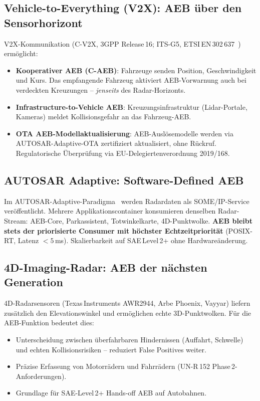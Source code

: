 ﻿\documentclass[a4paper,12pt]{article}
\theoremstyle{definition}
\begin{document}
\subsection{Vehicle-to-Everything (V2X): AEB \"uber den Sensorhorizont}

V2X-Kommunikation (C-V2X, 3GPP Release\,16; ITS-G5,
ETSI\,EN\,302\,637~\cite{etsi302637}) erm\"oglicht:

\begin{itemize}
  \item \textbf{Kooperativer AEB (C-AEB)}: Fahrzeuge senden Position,
        Geschwindigkeit und Kurs. Das empfangende Fahrzeug aktiviert
        AEB-Vorwarnung auch bei verdeckten Kreuzungen -- \emph{jenseits}
        des Radar-Horizonts.
  \item \textbf{Infrastructure-to-Vehicle AEB}: Kreuzungsinfrastruktur
        (Lidar-Portale, Kameras) meldet Kollisionsgefahr an das
        Fahrzeug-AEB.
  \item \textbf{OTA AEB-Modellaktualisierung}: AEB-Ausl\"osemodelle
        werden via AUTOSAR-Adaptive-OTA zertifiziert aktualisiert,
        ohne R\"uckruf. Regulatorische \"Uberpr\"ufung via
        EU-Delegiertenverordnung 2019/168.
\end{itemize}

\subsection{AUTOSAR Adaptive: Software-Defined AEB}

Im AUTOSAR-Adaptive-Paradigma~\cite{autosar2023adaptive} werden
Radardaten als SOME/IP-Service ver\"offent\-licht. Mehrere
Applikationscontainer konsumieren denselben Radar-Stream:
AEB-Core, Parkassistent, Totwinkelkarte, 4D-Punktwolke.
\textbf{AEB bleibt stets der priorisierte Consumer mit h\"ochster
Echtzeitpriorit\"at} (POSIX-RT, Latenz $<5$\,ms).
Skalierbarkeit auf SAE\,Level\,2+ ohne Hardware\"anderung.

\subsection{4D-Imaging-Radar: AEB der n\"achsten Generation}

4D-Radarsensoren (Texas\,Instruments AWR2944, Arbe Phoenix, Vayyar)
liefern zus\"atzlich den Elevationswinkel und erm\"oglichen echte
3D-Punktwolken. F\"ur die AEB-Funktion bedeutet dies:

\begin{itemize}
  \item Unterscheidung zwischen \"uberfahrbaren Hindernissen
        (Auffahrt, Schwelle) und echten Kollisionsrisiken
        -- reduziert False Positives weiter.
  \item Pr\"azise Erfassung von Motorr\"adern und Fahrr\"adern
        (UN-R\,152 Phase\,2-Anforderun\-gen).
  \item Grundlage f\"ur SAE-Level\,2+ Hands-off AEB auf Autobahnen.
\end{itemize}
\end{document}
